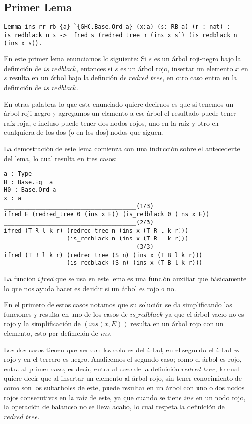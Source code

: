 \documentclass[letterpaper,12pt,oneside]{book}
\newcommand{\arn}{árbol roji-negro}
\theoremstyle{plain}
\theoremstyle{definition}
\theoremstyle{remark}
\begin{document}
\subsection{Primer Lema}

\begin{verbatim}
Lemma ins_rr_rb {a} `{GHC.Base.Ord a} (x:a) (s: RB a) (n : nat) :
is_redblack n s -> ifred s (redred_tree n (ins x s)) (is_redblack n (ins x s)).
\end{verbatim}
 En este primer lema enunciamos lo siguiente: Si $s$ es un {{{\arn}}} bajo la definici\'on de $is\_redblack$, entonces 
 si $s$ es un \'arbol rojo, insertar un elemento $x$ en $s$ resulta en un \'arbol bajo la definci\'on de 
 $redred\_tree$, en otro caso entra en la definici\'on de $is\_redblack$.

 En otras palabras lo que este enunciado quiere decirnos es que si tenemos un {{{\arn}}} y agregamos un elemento a ese \'arbol
 el resultado puede tener ra\'iz roja, e incluso puede tener dos nodos rojos, uno en la ra\'iz y otro en cualquiera de los dos
 (o en los dos) nodos que siguen.

 La demostraci\'on de este lema comienza con una inducci\'on sobre el antecedente del lema, lo cual resulta en tres casos:
 \begin{verbatim}
a : Type
H : Base.Eq_ a
H0 : Base.Ord a
x : a
______________________________________(1/3)
ifred E (redred_tree 0 (ins x E)) (is_redblack 0 (ins x E))
______________________________________(2/3)
ifred (T R l k r) (redred_tree n (ins x (T R l k r))) 
                  (is_redblack n (ins x (T R l k r)))
______________________________________(3/3)
ifred (T B l k r) (redred_tree (S n) (ins x (T B l k r)))
                  (is_redblack (S n) (ins x (T B l k r)))
 \end{verbatim}

 La funci\'on $ifred$ que se usa en este lema es una funci\'on auxiliar que b\'asicamente lo que nos ayuda hacer es decidir si un \'arbol es 
 rojo o no. 

 En el primero de estos casos notamos que su soluci\'on se da simplificando las funciones y resulta en uno de los casos
 de $is\_redblack$ ya que el \'arbol vacio no es rojo y la simplificaci\'on de $(ins(x,E))$ resulta en un \'arbol rojo con un elemento,
 esto por definici\'on de $ins$.

 Los dos casos tienen que ver con los colores del \'arbol, en el segundo el \'arbol es rojo y en el tercero es negro.
 Analicemos el segundo caso; como el \'arbol es rojo, entra al primer caso, es decir, entra al caso de la definici\'on $redred\_tree$,
 lo cual quiere decir que al insertar un elemento al \'arbol rojo, sin tener conocimiento de como son los subarboles de este, puede
 resultar en un \'arbol con uno o dos nodos rojos consecutivos en la ra\'iz de este, ya que cuando se tiene $ins$ en un nodo rojo, la operaci\'on de 
 balanceo no se lleva acabo, lo cual respeta la definici\'on de $redred\_tree$.
\end{document}
